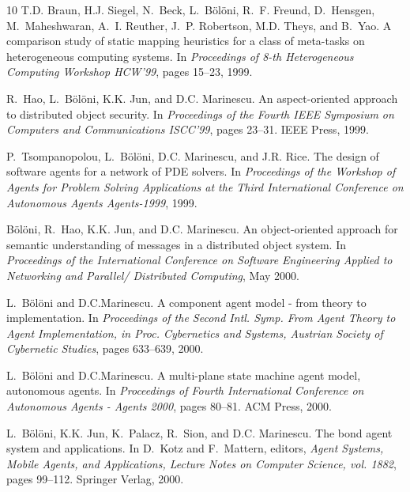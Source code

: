 \begin{thebibliography}{10}
T.D. Braun, H.J. Siegel, N.~Beck, L.~B{\"o}l{\"o}ni, R.~F. Freund, D.~Hensgen,
  M.~Maheshwaran, A.~I. Reuther, J.~P. Robertson, M.D. Theys, and B.~Yao.
\newblock A comparison study of static mapping heuristics for a class of
  meta-tasks on heterogeneous computing systems.
\newblock In {\em Proceedings of 8-th Heterogeneous Computing Workshop HCW'99},
  pages 15--23, 1999.

R.~Hao, L.~B{\"o}l{\"o}ni, K.K. Jun, and D.C. Marinescu.
\newblock An aspect-oriented approach to distributed object security.
\newblock In {\em Proceedings of the Fourth IEEE Symposium on Computers and
  Communications ISCC'99}, pages 23--31. IEEE Press, 1999.

P.~Tsompanopolou, L.~B{\"o}l{\"o}ni, D.C. Marinescu, and J.R. Rice.
\newblock The design of software agents for a network of {PDE} solvers.
\newblock In {\em Proceedings of the Workshop of Agents for Problem Solving
  Applications at the Third International Conference on Autonomous Agents
  {A}gents-1999}, 1999.

B{\"o}l{\"o}ni, R.~Hao, K.K. Jun, and D.C. Marinescu.
\newblock An object-oriented approach for semantic understanding of messages in
  a distributed object system.
\newblock In {\em Proceedings of the International Conference on Software
  Engineering Applied to Networking and Parallel/ Distributed Computing}, May
  2000.

L.~B{\"o}l{\"o}ni and D.C.Marinescu.
\newblock A component agent model - from theory to implementation.
\newblock In {\em Proceedings of the Second Intl. Symp. From Agent Theory to
  Agent Implementation, in Proc. Cybernetics and Systems, Austrian Society of
  Cybernetic Studies}, pages 633--639, 2000.

L.~B{\"o}l{\"o}ni and D.C.Marinescu.
\newblock A multi-plane state machine agent model, autonomous agents.
\newblock In {\em Proceedings of Fourth International Conference on Autonomous
  Agents - Agents 2000}, pages 80--81. ACM Press, 2000.

L.~B{\"o}l{\"o}ni, K.K. Jun, K.~Palacz, R.~Sion, and D.C. Marinescu.
\newblock The bond agent system and applications.
\newblock In D.~Kotz and F.~Mattern, editors, {\em Agent Systems, Mobile
  Agents, and Applications, Lecture Notes on Computer Science, vol. 1882},
  pages 99--112. Springer Verlag, 2000.


\end{thebibliography}
